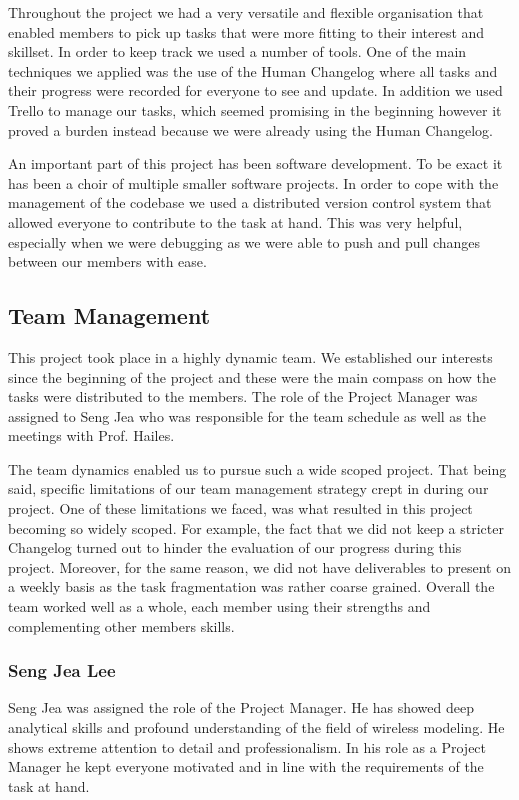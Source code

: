 Throughout the project we had a very versatile and flexible organisation that
enabled members to pick up tasks that were more fitting to their interest and
skillset. In order to keep track we used a number of tools. One of the main
techniques we applied was the use of the Human Changelog where all tasks and
their progress were recorded for everyone to see and update. In addition we used
Trello to manage our tasks, which seemed promising in the beginning however it
proved a burden instead because we were already using the Human Changelog.

An important part of this project has been software development. To be exact it
has been a choir of multiple smaller software projects. In order to cope with
the management of the codebase we used a distributed version control system that
allowed everyone to contribute to the task at hand. This was very helpful,
especially when we were debugging as we were able to push and pull changes
between our members with ease.


\subsection{Team Management}
This project took place in a highly dynamic team. We established our interests
since the beginning of the project and these were the main compass on how the
tasks were distributed to the members. The role of the Project Manager was
assigned to Seng Jea who was responsible for the team schedule as well as the
meetings with Prof. Hailes.

The team dynamics enabled us to pursue such a wide scoped project. That being
said, specific limitations of our team management strategy crept in during our
project. One of these limitations we faced, was what resulted in this project
becoming so widely scoped. For example, the fact that we did not keep a stricter
Changelog turned out to hinder the evaluation of our progress during this
project. Moreover, for the same reason, we did not have deliverables to present
on a weekly basis as the task fragmentation was rather coarse grained. Overall
the team worked well as a whole, each member using their strengths and
complementing other members skills.

\subsubsection{Seng Jea Lee}
Seng Jea was assigned the role of the Project Manager. He has showed deep
analytical skills and profound understanding of the field of wireless modeling.
He shows extreme attention to detail and professionalism. In his role as a
Project Manager he kept everyone motivated and in line with the requirements of
the task at hand.

